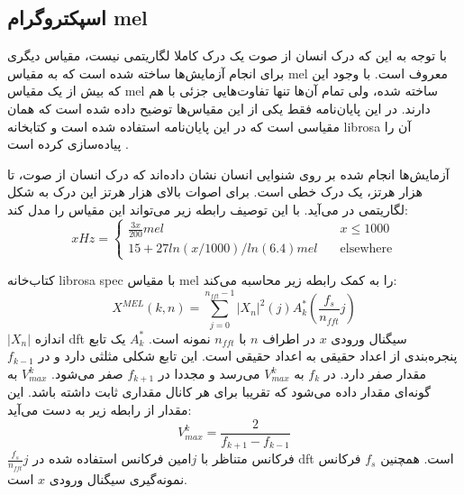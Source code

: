 \subsection{اسپکتروگرام mel}
با توجه به این که درک انسان از صوت یک درک کاملا لگاریتمی نیست، مقیاس دیگری برای
انجام آزمایش‌ها ساخته شده است که به مقیاس mel معروف است. با وجود این که بیش از یک
مقیاس mel ساخته شده، ولی تمام آن‌ها تنها تفاوت‌هایی جزئی با هم دارند. در این
پایان‌نامه فقط یکی از این مقیاس‌ها توضیح داده شده است که همان مقیاسی است که در
این پایان‌نامه استفاده شده است و کتابخانه librosa آن را پیاده‌سازی کرده است
\cite{mcfee2015librosa}.

آزمایش‌ها انجام شده بر روی شنوایی انسان نشان داده‌اند که درک انسان از صوت، تا
هزار هرتز، یک درک خطی است. برای اصوات بالای هزار هرتز این درک به شکل لگاریتمی در
می‌آید. با این توصیف رابطه زیر می‌تواند این مقیاس را مدل کند:
\begin{equation}
    x Hz =
    \begin{cases}
        \frac{3x}{200}mel &\quad x \leq 1000\\
        15 + 27 ln(x/1000) / ln(6.4) mel &\quad \text{elsewhere}
    \end{cases}
\end{equation}

کتاب‌خانه librosa \gls{spec} با مقیاس mel را به کمک رابطه زیر محاسبه می‌کند:
\begin{equation}
    X^{MEL}(k, n) = \sum_{j=0}^{n_{fft}-1} |X_n|^2(j)A_k^*(\frac{f_s}{n_{fft}}j)
\end{equation}
$|X_n|$ اندازه \gls{dft} سیگنال ورودی $x$ در اطراف $n$ با $n_{fft}$ نمونه است.
$A_k^*$ یک تابع پنجره‌بندی از اعداد حقیقی به اعداد حقیقی است. این تابع شکلی
مثلثی دارد و در $f_{k-1}$ مقدار صفر دارد. در $f_k$ به $V_{max}^{k}$ می‌رسد و
مجددا در $f_{k+1}$ صفر می‌شود. $V_{max}^{k}$ به گونه‌ای مقدار داده می‌شود که
تقریبا برای هر کانال مقداری ثابت داشته باشد. این مقدار از رابطه زیر به دست
می‌آید:
\begin{equation}
    V_{max}^{k} = \frac{2}{f_{k+1} - f_{k-1}}
\end{equation}
$\frac{f_s}{n_{fft}}j$ فرکانس متناظر با $j$امین فرکانس استفاده شده در \gls{dft}
است. همچنین $f_s$ فرکانس نمونه‌گیری سیگنال ورودی $x$ است.

